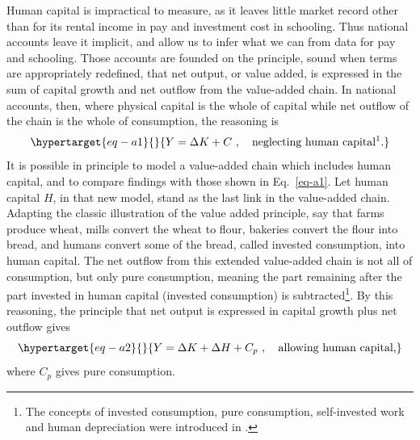 Human capital is impractical to measure, as it leaves little market
record other than for its rental income in pay and investment cost in schooling. Thus national accounts
leave it implicit, and allow us to infer what we can from data for pay and schooling. Those
accounts are founded on the principle, sound when terms are appropriately redefined, that net output,
or value added, is expressed in the sum of capital growth and net
outflow from the value-added chain. In national accounts, then, where
physical capital is the whole of capital while net outflow of the chain
is the whole of consumption, the reasoning is
%
\begin{equation}\protect\hypertarget{eq-a1}{}{Y = \Delta K + C \ , \quad \text{neglecting human capital\footnotemark.}}\label{eq-a1}\end{equation}
%
It is possible in principle to model a value-added chain which includes human
capital, and to compare findings with those shown in Eq.~\eqref{eq-a1}.
Let human capital $H$, in that new model, stand as the last link in the
value-added chain. Adapting the classic illustration of the value added
principle, say that farms produce wheat, mills convert the wheat to
flour, bakeries convert the flour into bread, and humans convert some of
the bread, called invested consumption, into human capital. The net
outflow from this extended value-added chain is not all of consumption,
but only pure consumption, meaning the part remaining after the part invested in human capital (invested consumption) is
subtracted\footnote{The concepts of invested consumption, pure consumption, self-invested work and human depreciation were introduced in \cite{schultzInvestmentHumanCapital1961}.}. By this reasoning, the principle
that net output is expressed in capital growth plus net outflow gives
%
\begin{equation}
\protect\hypertarget{eq-a2}{}{Y = \Delta K + \Delta H + C_{p}\ , \quad \text{allowing human capital,}}\label{eq-a2}
\end{equation}
%
where \(C_{p}\) gives pure consumption.

